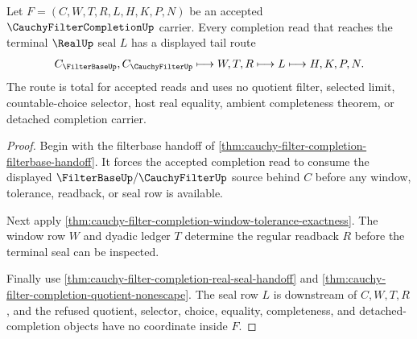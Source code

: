 \begin{theorem}
\label{thm:cauchy-filter-completion-real-seal-choice-free-tail-totality}
Let $F=(C,W,T,R,L,H,K,P,N)$ be an accepted $\CauchyFilterCompletionUp$ carrier. Every completion read that reaches the terminal $\RealUp$ seal $L$ has a displayed tail route
$$
C_{\FilterBaseUp},C_{\CauchyFilterUp} \longmapsto W,T,R \longmapsto L \longmapsto H,K,P,N .
$$
The route is total for accepted reads and uses no quotient filter, selected limit, countable-choice selector, host real equality, ambient completeness theorem, or detached completion carrier.
\end{theorem}
\begin{proof}
Begin with the filterbase handoff of \autoref{thm:cauchy-filter-completion-filterbase-handoff}. It forces the accepted completion read to consume the displayed $\FilterBaseUp/\CauchyFilterUp$ source behind $C$ before any window, tolerance, readback, or seal row is available.

Next apply \autoref{thm:cauchy-filter-completion-window-tolerance-exactness}. The window row $W$ and dyadic ledger $T$ determine the regular readback $R$ before the terminal seal can be inspected.

Finally use \autoref{thm:cauchy-filter-completion-real-seal-handoff} and \autoref{thm:cauchy-filter-completion-quotient-nonescape}. The seal row $L$ is downstream of $C,W,T,R$, and the refused quotient, selector, choice, equality, completeness, and detached-completion objects have no coordinate inside $F$.
\end{proof}

